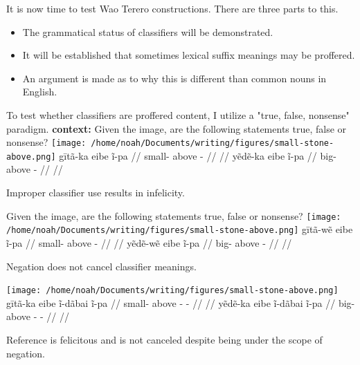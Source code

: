\documentclass{beamer}
\begin{document}
\begin{frame}{It is now time to test Wao Terero constructions.}
  There are three parts to this.

  \begin{itemize}
  \item The grammatical status of classifiers will be demonstrated.
  \item It will be established that sometimes lexical suffix meanings may be proffered.
  \item An argument is made as to why this is different than common nouns in English.
  \end{itemize}
\end{frame}

\begin{frame}{To test whether classifiers are proffered content, I utilize a "true, false, nonsense" paradigm.}
  \pex\label{rock1} {\bf context:} Given the image, are the following statements true, false or nonsense?\newline
  \texttt{[image: /home/noah/Documents/writing/figures/small-stone-above.png]}
  \a{}\begingl
  \gla gītã-ka eibe ĩ-pa //
  \glb small- above - //
  \glft {} //
  \endgl
  \a{}\begingl
  \gla yẽdẽ-ka eibe ĩ-pa //
  \glb big- above - //
  \glft {} //
  \endgl
  \xe
 
\end{frame}

\begin{frame}{Improper classifier use results in infelicity.}

   Given the image, are the following statements true, false or nonsense?\newline
  \texttt{[image: /home/noah/Documents/writing/figures/small-stone-above.png]}
  \a\ljudge{\#}\begingl
  \gla gītã-wẽ eibe ĩ-pa //
  \glb small- above - //
  \glft {} //
  \endgl
  \a\ljudge{\#}\begingl
  \gla yẽdẽ-wẽ eibe ĩ-pa //
  \glb big- above - //
  \glft {} //
  \endgl
  \xe
\end{frame}

\begin{frame}{Negation does not cancel classifier meanings.}
  
  \pex\label{rock1} \texttt{[image: /home/noah/Documents/writing/figures/small-stone-above.png]}
  \a{}\begingl
  \gla gītã-ka eibe ĩ-dãbai ĩ-pa //
  \glb small- above - - //
  \glft {} //
  \endgl
  \a{}\begingl
  \gla yẽdẽ-ka eibe ĩ-dãbai ĩ-pa //
  \glb big- above - - //
  \glft {} //
  \endgl
  \xe

  Reference is felicitous and is not canceled despite being under the scope of negation.
\end{frame}
\end{document}
